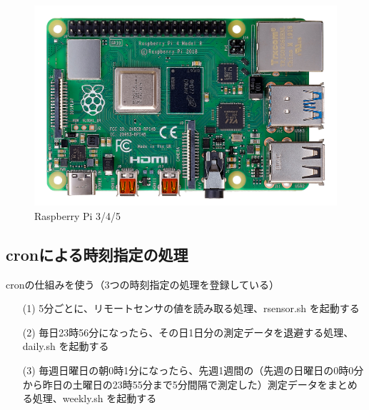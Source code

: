 \documentclass[12pt,a4paper,uplatex]{jsbook}
\begin{document}
\begin{figure}[H]
	\begin{minipage}[b]{1.0\linewidth}
		\centering
		\includegraphics[keepaspectratio, scale=0.12]{figs/jpg/udrp4b_front.jpg}
		\caption{Raspberry Pi 3/4/5}
	\end{minipage}
\end{figure}


\newpage

\subsection{cronによる時刻指定の処理}

cronの仕組みを使う（3つの時刻指定の処理を登録している）
\begin{enumerate}
	\item[(1)] 5分ごとに、リモートセンサの値を読み取る処理、rsensor.sh を起動する
	\item[(2)] 毎日23時56分になったら、その日1日分の測定データを退避する処理、daily.sh を起動する
	\item[(3)] 毎週日曜日の朝0時1分になったら、先週1週間の（先週の日曜日の0時0分から昨日の土曜日の23時55分まで5分間隔で測定した）測定データをまとめる処理、weekly.sh を起動する
\end{enumerate}
\end{document}
